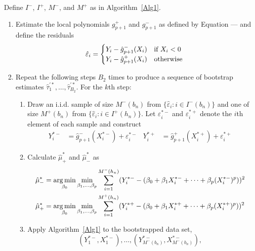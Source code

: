 \documentclass[12pt,fleqn]{article}
\begin{document}
\begin{algorithm}\label{Alg2}
  Define $I^{-}$, $I^{+}$, $M^{-}$, and $M^{+}$ as in Algorithm~\ref{Alg1}.
  \begin{enumerate}
  \item Estimate the local polynomials $g_{p+1}^{+}$ and $g_{p+1}^{-}$ as defined by
    Equation --- and define the residuals
    \begin{equation}
      \label{eq:3}
      \hat\varepsilon_{i} =
      \begin{cases}
        Y_i - \hat g_{p+1}^-(X_{i}) & \text{if}\ X_{i} < 0 \\
        Y_i - \hat g_{p+1}^+(X_{i}) & \text{otherwise}
      \end{cases}
    \end{equation}
  \item Repeat the following steps $B_{2}$ times to produce a sequence of bootstrap
    estimates $\hat\tau_1^{\prime*},\dots,\hat\tau_{B_{2}}^{\prime*}$. For the $k$th step:
    \begin{enumerate}
    \item Draw an i.i.d. sample of size $M^{-}(b_{n})$ from
      $\{\hat\varepsilon_{i} : i \in I^{-}(b_{n})\}$ and one of size $M^{+}(b_{n})$ from
      $\{\hat\varepsilon_i : i \in I^{+}(h_{n})\}$. Let $\varepsilon_{i}^{*-}$ and
      $\varepsilon_i^{*+}$ denote the $i$th element of each sample and construct
      \begin{align}
        Y_i^{*-} &= \hat g_{p+1}^-(X_i^{*-}) + \varepsilon_i^{*-} &
        Y_i^{*+} &= \hat g_{p+1}^+(X_i^{*+}) + \varepsilon_i^{*+}
      \end{align}
    \item Calculate $\hat\mu_+^*$ and $\hat\mu_-^*$ as
      \begin{align}
        \hat\mu_-^*
        &= \operatorname*{arg\,min}_{\beta_0} \min_{\beta_1,\dots,\beta_p}
          \sum_{i = 1}^{M^-(h_n)} (Y_i^{*-} -
          (\beta_0 + \beta_1 X_i^{*-} + \cdots + \beta_p (X_i^{*-})^p))^2 \\
        \hat\mu_+^*
        &= \operatorname*{arg\,min}_{\beta_0} \min_{\beta_1,\dots,\beta_p}
          \sum_{i = 1}^{M^+(h_n)} (Y_i^{*+} -
          (\beta_0 + \beta_1 X_i^{*+} + \cdots + \beta_p (X_i^{*+})^p))^2
      \end{align}
    \item Apply Algorithm~\ref{Alg1} to the bootstrapped data set,
      \begin{equation*}
        (Y_1^{*-}, X_1^{*-}),\dots,(Y_{M^-(b_n)}^{*-},X_{M^-(b_n)}^{*-}),

\end{equation*}
\end{enumerate}
\end{enumerate}
\end{algorithm}
\end{document}
